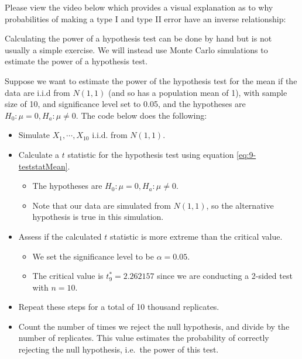 \documentclass[
]{book}
\providecommand{\tightlist}{%
  \setlength{\itemsep}{0pt}\setlength{\parskip}{0pt}}
\begin{document}
Please view the video below which provides a visual explanation as to why probabilities of making a type I and type II error have an inverse relationship:

Calculating the power of a hypothesis test can be done by hand but is not usually a simple exercise. We will instead use Monte Carlo simulations to estimate the power of a hypothesis test.

Suppose we want to estimate the power of the hypothesis test for the mean if the data are i.i.d from \(N(1,1)\) (and so has a population mean of 1), with sample size of 10, and significance level set to 0.05, and the hypotheses are \(H_0: \mu = 0, H_a: \mu \neq 0\). The code below does the following:

\begin{itemize}
\tightlist
\item
  Simulate \(X_1, \cdots, X_{10}\) i.i.d. from \(N(1,1)\).
\item
  Calculate a \(t\) statistic for the hypothesis test using equation \eqref{eq:9-teststatMean}.

  \begin{itemize}
  \tightlist
  \item
    The hypotheses are \(H_0: \mu = 0, H_a: \mu \neq 0\).
  \item
    Note that our data are simulated from \(N(1,1)\), so the alternative hypothesis is true in this simulation.
  \end{itemize}
\item
  Assess if the calculated \(t\) statistic is more extreme than the critical value.

  \begin{itemize}
  \tightlist
  \item
    We set the significance level to be \(\alpha = 0.05\).
  \item
    The critical value is \(t_9^* = 2.262157\) since we are conducting a 2-sided test with \(n=10\).
  \end{itemize}
\item
  Repeat these steps for a total of 10 thousand replicates.
\item
  Count the number of times we reject the null hypothesis, and divide by the number of replicates. This value estimates the probability of correctly rejecting the null hypothesis, i.e.~the power of this test.
\end{itemize}
\end{document}
